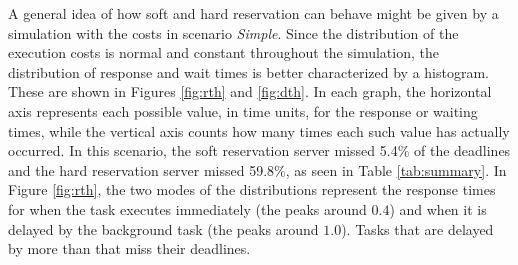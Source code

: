 \documentclass[12pt]{article}
\newcommand{\Lum}{\textit{Simple}}
\begin{document}
A general idea of how soft and hard reservation can behave might be
given by a simulation with the costs in scenario \Lum{}. Since the
distribution of the execution costs is normal and constant throughout
the simulation, the distribution of response and wait times is better
characterized by a histogram. These are shown in Figures \ref{fig:rth}
and \ref{fig:dth}. In each graph, the horizontal axis represents each
possible value, in time units, for the response or waiting times,
while the vertical axis counts how many times each such value has
actually occurred. In this scenario, the soft reservation server
missed 5.4\% of the deadlines and the hard reservation server missed
59.8\%, as seen in Table \ref{tab:summary}. In Figure \ref{fig:rth},
the two modes of the distributions represent the response times for
when the task executes immediately (the peaks around $0.4$) and when
it is delayed by the background task (the peaks around $1.0$). Tasks
that are delayed by more than that miss their deadlines.
\end{document}
